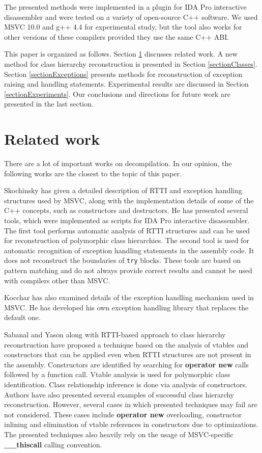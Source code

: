 \documentclass[times, 10pt,twocolumn]{article}
\renewcommand{\~}{{\raise.35ex\hbox{$\scriptstyle\sim$}}}
\begin{document}
The presented methods were implemented in a plugin for IDA Pro
interactive disassembler \cite{ida} and were tested on a variety
of open-source C++ software. We used MSVC 10.0 and g++ 4.4
for experimental study, but the tool also works for
other versions of these compilers provided they use the same C++ ABI.

This paper is organized as follows. Section
\ref{sectionRelatedWork} discusses related work.
A new method for class hierarchy reconstruction is presented in
Section \ref{sectionClasses}.
Section \ref{sectionExceptions} presents methods for reconstruction
of exception raising and handling statements.
Experimental results are discussed in Section \ref{sectionExperiments}.
Our conclusions and directions for future work are
presented in the last section.




\quad
\section{Related work}\label{sectionRelatedWork}
There are a lot of important works on decompilation.
In our opinion,
the following works are the closest to the topic of this paper.

Skochinsky \cite{skochinsky06e, skochinsky06c} has given a detailed description
of RTTI and exception handling structures used by MSVC,
along with the implementation details of some of the C++ concepts,
such as constructors and destructors.
He has presented several tools, which were implemented as scripts for
IDA Pro interactive disassembler. The first tool performs automatic analysis
of RTTI structures and can be used for reconstruction of polymorphic class hierarchies.
The second tool is used for automatic recognition of exception handling
statements in the assembly code. It does not reconstruct the boundaries of \lstinline{try} blocks.
These tools are based on pattern matching and do not always provide correct
results and cannot be used with compilers other than MSVC.

Kocchar \cite{kocchar02} has also examined details of the exception
handling mechanism used in MSVC. He has developed his own exception handling
library that replaces the default one.

Sabanal and Yason \cite{sabanal07} along with RTTI-based approach
to class hierarchy reconstruction
have proposed a technique based on the analysis of vtables and
constructors that can be applied even when RTTI structures are
not present in the assembly.
Constructors are identified by searching for \textbf{operator new}
calls followed by a function call.
Vtable analysis is used for polymorphic class identification.
Class relationship inference is done via analysis of constructors.
Authors have also presented several examples of successful class
hierarchy reconstruction.
However, several cases in which presented techniques may fail are
not considered.
These cases include \textbf{operator new} overloading,
constructor inlining and elimination of vtable references in
constructors due to optimizations.
The presented techniques also heavily rely on the usage of
MSVC-specific \textbf{\_\_thiscall} calling convention.
\end{document}

